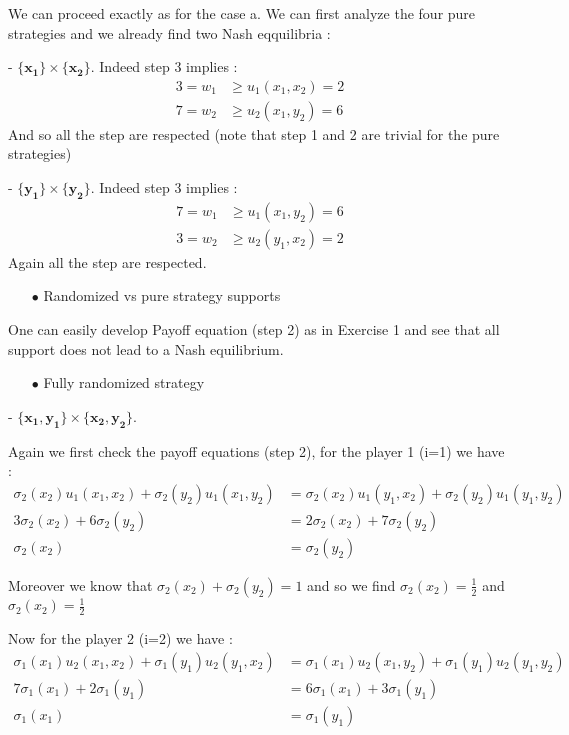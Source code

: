 We can proceed exactly as for the case a. We can first analyze the four pure strategies and we already find two Nash eqquilibria :

- $\mathbf{\{x_1\}}\times\mathbf{\{x_2\}}$. Indeed step 3 implies :
\begin{align*}
    3 =w_1&\ge u_1(x_1,x_2)=2 \\
    7=w_2&\ge u_2(x_1,y_2)=6 
\end{align*}
And so all the step are respected (note that step 1 and 2 are trivial for the pure strategies) 

- $\mathbf{\{y_1\}}\times\mathbf{\{y_2\}}$. Indeed step 3 implies :
\begin{align*}
    7 =w_1&\ge u_1(x_1,y_2)=6 \\
    3=w_2&\ge u_2(y_1,x_2)=2
\end{align*}
Again all the step are respected.


\begin{itemize}
  \item[$\bullet$] Randomized vs pure strategy supports
\end{itemize}

One can easily develop Payoff equation (step 2) as in Exercise 1 and see that all support does not lead to a Nash equilibrium.

\begin{itemize}
  \item[$\bullet$] Fully randomized strategy 
\end{itemize}
- $\mathbf{\{x_1,y_1\}}\times\mathbf{\{x_2,y_2\}}$.

Again we first check the payoff equations (step 2), for the player 1 (i=1) we have : 
\begin{align*}
 \sigma_2(x_2)u_1(x_1,x_2) + \sigma_2(y_2)u_1(x_1,y_2) &= \sigma_2(x_2)u_1(y_1,x_2) + \sigma_2(y_2)u_1(y_1,y_2) \\
 3\sigma_2(x_2)+6\sigma_2(y_2)&= 2\sigma_2(x_2) + 7\sigma_2(y_2) \\
 \sigma_2(x_2)&=\sigma_2(y_2)
\end{align*}

Moreover we know that $\sigma_2(x_2) + \sigma_2(y_2) = 1$ and so we find $\sigma_2(x_2)=\frac{1}{2}$ and $\sigma_2(x_2)=\frac{1}{2}$

Now for the player 2 (i=2) we have : 
\begin{align*}
 \sigma_1(x_1)u_2(x_1,x_2) + \sigma_1(y_1)u_2(y_1,x_2) &= \sigma_1(x_1)u_2(x_1,y_2) + \sigma_1(y_1)u_2(y_1,y_2) \\
 7\sigma_1(x_1)+2\sigma_1(y_1)&= 6\sigma_1(x_1) + 3\sigma_1(y_1) \\
 \sigma_1(x_1)&=\sigma_1(y_1)
\end{align*}

